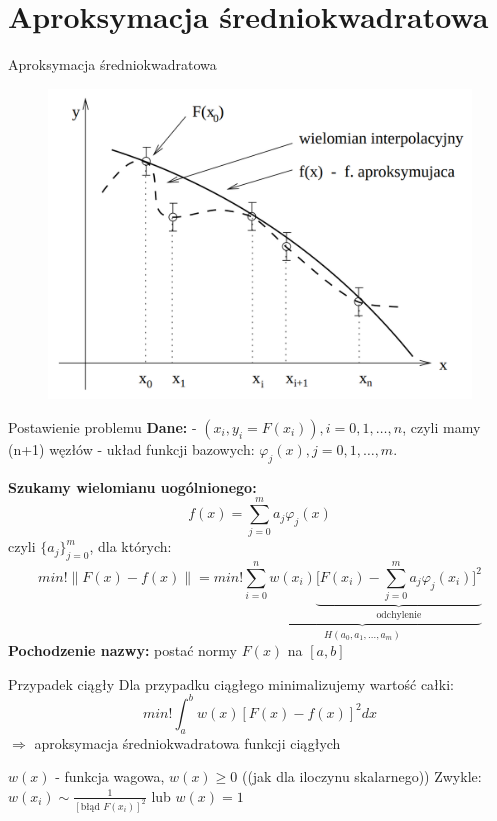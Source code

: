 \section{Aproksymacja średniokwadratowa}
\begin{frame}{Aproksymacja średniokwadratowa}
  	\begin{figure}
	\includegraphics[height=0.8\textheight]{img/5/aproksymacja_sredniokwadratowa}
	\end{figure}
\end{frame}
\begin{frame}{Postawienie problemu}
	\textbf{Dane:}\newline
    - ${(x_i,y_i = F(x_i)),i=0,1,\ldots,n}$, czyli mamy (n+1) węzłów \newline
    - układ funkcji bazowych: $\varphi_j(x), j=0,1,\ldots,m$.\newline\par
    \textbf{Szukamy wielomianu uogólnionego:}
    $$f(x) = \sum_{j = 0}^{m} a_j \varphi_j(x)$$
    czyli $\{{a_j}\}_{j=0}^m$, dla których:
    $$min!\parallel F(x) - f(x) \parallel = min!\underbrace{ \sum_{i=0}^{n}w(x_i)\underbrace{\bigg[F(x_i)-\sum_{j=0}^{m}a_j\varphi_j(x_i)\bigg]^2}_\text{odchylenie}}_{H(a_0,a_1,\ldots,a_m)}$$
    \textbf{Pochodzenie nazwy:} postać normy $F(x)$ na $[a,b]$
\end{frame}
\begin{frame}{Przypadek ciągły}
    Dla przypadku ciągłego minimalizujemy wartość całki:
    $$min!\int_a^bw(x)[F(x)-f(x)]^2dx%
    $$
    $\Rightarrow$ aproksymacja średniokwadratowa funkcji ciągłych\newline

    $w(x)$ - funkcja wagowa, $w(x)\geqslant0$ ((jak dla iloczynu skalarnego))\newline
    Zwykle: $w(x_i) \sim \frac{1}{[\text{błąd }F(x_i)]^2}$ lub $w(x) = 1$
\end{frame}
